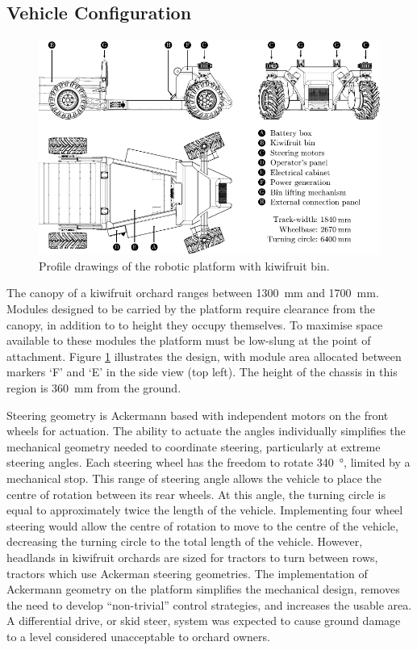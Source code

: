 \documentclass[preprint,authoryear,12pt]{elsarticle}
\begin{document}
    \subsection{Vehicle Configuration}
    \label{sect:mechanical}

        \begin{figure}[htb]
            \centering
            \includegraphics[width=\linewidth]{imgs/profile_views/AMMP-All-Labelled.pdf}
            \caption{Profile drawings of the robotic platform with kiwifruit bin.}
            \label{fig:AMMP}
        \end{figure}

        The canopy of a kiwifruit orchard ranges between \SI{1300}{\milli\meter} and \SI{1700}{\milli\meter}.
        Modules designed to be carried by the platform require clearance from the canopy, in addition to to height they occupy themselves.
        To maximise space available to these modules the platform must be low-slung at the point of attachment.
        Figure \ref{fig:AMMP} illustrates the design, with module area allocated between markers `F' and `E' in the side view (top left).
        The height of the chassis in this region is \SI{360}{\milli\meter} from the ground.

        Steering geometry is Ackermann based with independent motors on the front wheels for actuation.
        The ability to actuate the angles individually simplifies the mechanical geometry needed to coordinate steering, particularly at extreme steering angles.
        Each steering wheel has the freedom to rotate \SI{340}{\degree}, limited by a mechanical stop.
        This range of steering angle allows the vehicle to place the centre of rotation between its rear wheels.
        At this angle, the turning circle is equal to approximately twice the length of the vehicle.
        Implementing four wheel steering would allow the centre of rotation to move to the centre of the vehicle, decreasing the turning circle to the total length of the vehicle.
        However, headlands in kiwifruit orchards are sized for tractors to turn between rows, tractors which use Ackerman steering geometries.
        The implementation of Ackermann geometry on the platform simplifies the mechanical design, removes the need to develop ``non-trivial'' control strategies, and increases the usable area.
        A differential drive, or skid steer, system was expected to cause ground damage to a level considered unacceptable to orchard owners.
\end{document}
